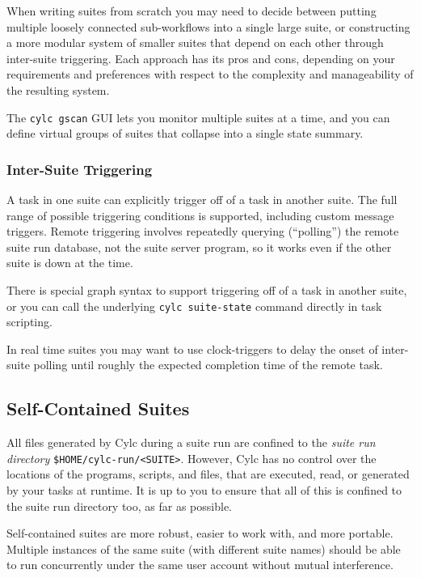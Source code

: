 When writing suites from scratch you may need to decide between putting
multiple loosely connected sub-workflows into a single large suite, or
constructing a more modular system of smaller suites that depend on each other
through inter-suite triggering. Each approach has its pros and cons, depending
on your requirements and preferences with respect to the complexity and
manageability of the resulting system.

The \lstinline=cylc gscan= GUI lets you monitor multiple suites at a time, and
you can define virtual groups of suites that collapse into a single state
summary.

\subsubsection{Inter-Suite Triggering}

A task in one suite can explicitly trigger off of a task in another suite. The
full range of possible triggering conditions is supported, including custom
message triggers. Remote triggering involves repeatedly querying (``polling'')
the remote suite run database, not the suite server program, so it works even
if the other suite is down at the time.

There is special graph syntax to support triggering off of a task in another
suite, or you can call the underlying \lstinline=cylc suite-state= command
directly in task scripting.

In real time suites you may want to use clock-triggers to delay the onset of
inter-suite polling until roughly the expected completion time of the remote
task.

\subsection{Self-Contained Suites}
\label{Self-Contained Suites}

All files generated by Cylc during a suite run are confined to the {\em suite
run directory} \lstinline=$HOME/cylc-run/<SUITE>=. However, Cylc has no control
over the locations of the programs, scripts, and files, that are executed,
read, or generated by your tasks at runtime.  It is up to you to ensure that
all of this is confined to the suite run directory too, as far as possible.

Self-contained suites are more robust, easier to work with, and more portable.
Multiple instances of the same suite (with different suite names) should be
able to run concurrently under the same user account without mutual
interference.

